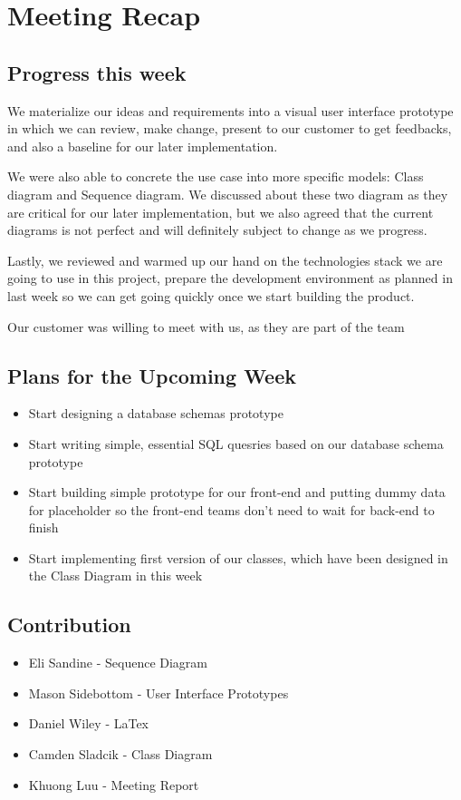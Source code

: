 \newpage
\section{Meeting Recap}
\subsection{Progress this week}
We materialize our ideas and requirements into a visual user interface prototype in which we can review, make change, present to our customer to get feedbacks, and also a baseline for our later implementation.\par
We were also able to concrete the use case into more specific models: Class diagram and Sequence diagram. We discussed about these two diagram as they are critical for our later  implementation, but we also agreed that the current diagrams is not perfect and will definitely subject to change as we progress.\par
Lastly, we reviewed and warmed up our hand on the technologies stack we are going to use in this project, prepare the development environment as planned in last week so we can get going quickly once we start building the product.\par
Our customer was willing to meet with us, as they are part of the team


\subsection{Plans for the Upcoming Week}
\begin{itemize}
	\item Start designing a database schemas prototype
	\item Start writing simple, essential SQL quesries based on our database schema prototype
	\item Start building simple prototype for our front-end and putting dummy data for placeholder so the front-end teams don't need to wait for back-end to finish
	\item Start implementing first version of our classes, which have been designed in the Class Diagram in this week
\end{itemize}

\subsection{Contribution}
\begin{itemize}
	\item Eli Sandine - Sequence Diagram
	\item Mason Sidebottom - User Interface Prototypes
	\item Daniel Wiley - LaTex
	\item Camden Sladcik - Class Diagram
	\item Khuong Luu - Meeting Report
\end{itemize}
